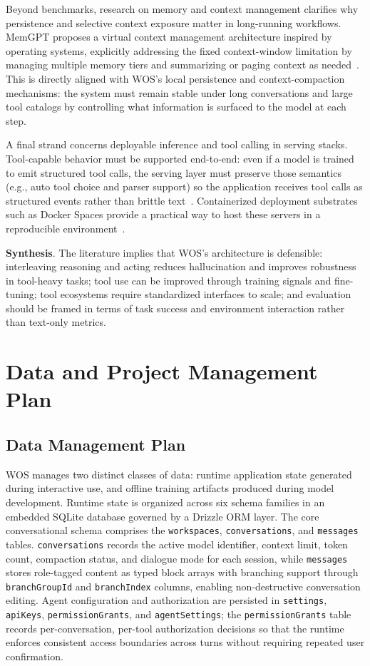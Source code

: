 \documentclass[conference]{IEEEtran}
\begin{document}
Beyond benchmarks, research on memory and context management clarifies why persistence and selective context exposure matter in long-running workflows. MemGPT proposes a virtual context management architecture inspired by operating systems, explicitly addressing the fixed context-window limitation by managing multiple memory tiers and summarizing or paging context as needed~\cite{packer2023memgpt}. This is directly aligned with WOS’s local persistence and context-compaction mechanisms: the system must remain stable under long conversations and large tool catalogs by controlling what information is surfaced to the model at each step.

A final strand concerns deployable inference and tool calling in serving stacks. Tool-capable behavior must be supported end-to-end: even if a model is trained to emit structured tool calls, the serving layer must preserve those semantics (e.g., auto tool choice and parser support) so the application receives tool calls as structured events rather than brittle text~\cite{vllm_openai_server,vllm_tool_calling}. Containerized deployment substrates such as Docker Spaces provide a practical way to host these servers in a reproducible environment~\cite{hf_docker_spaces}.

\textbf{Synthesis}. The literature implies that WOS’s architecture is defensible: interleaving reasoning and acting reduces hallucination and improves robustness in tool-heavy tasks; tool use can be improved through training signals and fine-tuning; tool ecosystems require standardized interfaces to scale; and evaluation should be framed in terms of task success and environment interaction rather than text-only metrics.

\section{Data and Project Management Plan}
\subsection{Data Management Plan}
WOS manages two distinct classes of data: runtime application state generated during interactive use, and offline training artifacts produced during model development. Runtime state is organized across six schema families in an embedded SQLite database governed by a Drizzle ORM layer. The core conversational schema comprises the \texttt{workspaces}, \texttt{conversations}, and \texttt{messages} tables. \texttt{conversations} records the active model identifier, context limit, token count, compaction status, and dialogue mode for each session, while \texttt{messages} stores role-tagged content as typed block arrays with branching support through \texttt{branchGroupId} and \texttt{branchIndex} columns, enabling non-destructive conversation editing. Agent configuration and authorization are persisted in \texttt{settings}, \texttt{apiKeys}, \texttt{permissionGrants}, and \texttt{agentSettings}; the \texttt{permissionGrants} table records per-conversation, per-tool authorization decisions so that the runtime enforces consistent access boundaries across turns without requiring repeated user confirmation.
\end{document}
